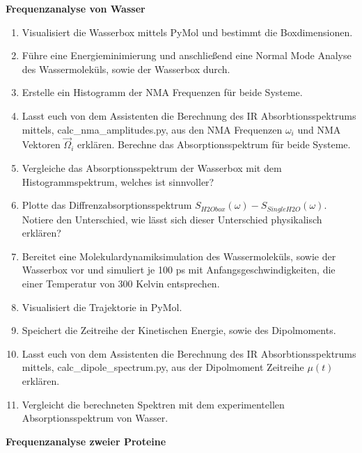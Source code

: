 \documentclass[a4paper,12pt]{article}
\begin{document}
\textbf{Frequenzanalyse von Wasser}
\begin{enumerate}
 \item Visualisiert die Wasserbox mittels PyMol und bestimmt die Boxdimensionen.
 \item Führe eine Energieminimierung und anschließend eine Normal Mode Analyse des Wassermoleküls, sowie der Wasserbox durch.
 \item Erstelle ein Histogramm der NMA Frequenzen für beide Systeme.
 \item Lasst euch von dem Assistenten die Berechnung des IR Absorbtionsspektrums mittels, calc\_nma\_amplitudes.py, aus den NMA Frequenzen $\omega_i$ und NMA Vektoren $\vec{\Omega}_i$ erklären.
 Berechne das Absorptionsspektrum für beide Systeme.
 \item Vergleiche das Absorptionsspektrum der Wasserbox mit dem Histogrammspektrum, welches ist sinnvoller?
 \item Plotte das Diffrenzabsorptionsspektrum $S_{H2Obox}(\omega)-S_{SingleH2O}(\omega)$. Notiere den Unterschied, wie lässt sich dieser Unterschied physikalisch erklären?
 \item Bereitet eine Molekulardynamiksimulation des Wassermoleküls, sowie der Wasserbox vor und simuliert je 100 ps mit Anfangsgeschwindigkeiten, die einer Temperatur von 300 Kelvin entsprechen.
 \item Visualisiert die Trajektorie in PyMol.
 \item Speichert die Zeitreihe der Kinetischen Energie, sowie des Dipolmoments. 
 \item Lasst euch von dem Assistenten die Berechnung des IR Absorbtionsspektrums mittels, calc\_dipole\_spectrum.py, aus der Dipolmoment Zeitreihe $\mu(t)$ erklären.
 \item Vergleicht die berechneten Spektren mit dem experimentellen Absorptionsspektrum von Wasser.
\end{enumerate}

\textbf{Frequenzanalyse zweier Proteine}
\end{document}
